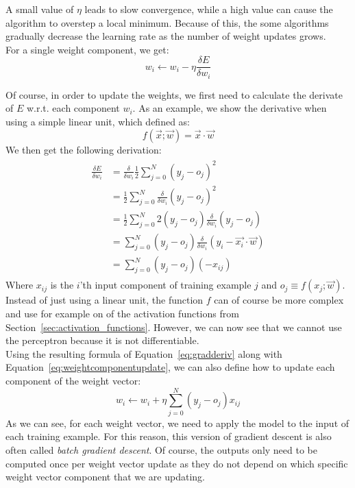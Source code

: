 A small value of $\eta$ leads to slow convergence, while a high value can cause the algorithm to overstep a local minimum. Because of this, the some algorithms gradually decrease the learning rate as the number of weight updates grows.\\
For a single weight component, we get:
\begin{equation}
    \label{eq:weightcomponentupdate}
    w_i \gets w_i - \eta \frac{\delta E}{\delta w_i}
\end{equation}

Of course, in order to update the weights, we first need to calculate the derivate of $E$ w.r.t. each component $w_i$. As an example, we show the derivative when using a simple linear unit, which defined as:
\begin{equation}
    f(\overrightarrow{x};\overrightarrow{w}) = \overrightarrow{x} \cdot \overrightarrow{w}
\end{equation}
We then get the following derivation:
\begin{align}
    \label{eq:gradderiv}
    \begin{split}
        \frac{\delta E}{\delta w_i} &= \frac{\delta}{\delta w_i} \frac{1}{2} \sum_{j=0}^N (y_j - o_j)^2\\
        &= \frac{1}{2} \sum_{j=0}^N \frac{\delta}{\delta w_i} (y_j - o_j)^2\\
        &= \frac{1}{2} \sum_{j=0}^N 2 (y_j - o_j) \frac{\delta}{\delta w_i} (y_j - o_j)\\
        &= \sum_{j=0}^N (y_j - o_j) \frac{\delta}{\delta w_i} (y_i - \overrightarrow{x_i} \cdot \overrightarrow{w})\\
        &= \sum_{j=0}^N (y_j - o_j)(-x_{ij})
    \end{split}
\end{align}
Where $x_{ij}$ is the $i$'th input component of training example $j$ and $o_j \equiv f(x_j; \overrightarrow{w})$. Instead of just using a linear unit, the function $f$ can of course be more complex and use for example on of the activation functions from Section~\ref{sec:activation_functions}. However, we can now see that we cannot use the perceptron because it is not differentiable.\\

Using the resulting formula of Equation~\ref{eq:gradderiv} along with Equation~\ref{eq:weightcomponentupdate}, we can also define how to update each component of the weight vector:
\begin{equation}
    w_i \gets w_i + \eta \sum_{j=0}^N (y_j - o_j)x_{ij}
\end{equation}
As we can see, for each weight vector, we need to apply the model to the input of each training example. For this reason, this version of gradient descent is also often called \textit{batch gradient descent}. Of course, the outputs only need to be computed once per weight vector update as they do not depend on which specific weight vector component that we are updating.\\

